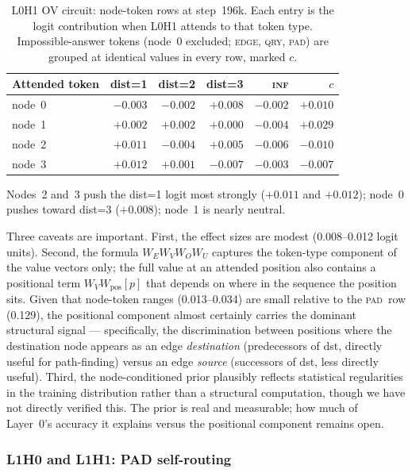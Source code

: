 \documentclass[11pt, a4paper]{article}
\newcommand{\INF}{\textsc{inf}}
\newcommand{\PAD}{\textsc{pad}}
\newcommand{\EDGE}{\textsc{edge}}
\newcommand{\QRY}{\textsc{qry}}
\begin{document}
\begin{table}[H]
\centering
\caption{L0H1 OV circuit: node-token rows at step~196k.  Each entry is
  the logit contribution when L0H1 attends to that token type.
  Impossible-answer tokens (node~0 excluded; \EDGE, \QRY, \PAD) are
  grouped at identical values in every row, marked $c$.}
\label{tab:l0h1-ov}
\begin{tabular}{@{}lrrrrr@{}}
\toprule
Attended token & dist=1 & dist=2 & dist=3 & \INF & $c$ \\
\midrule
node~0 & $-0.003$ & $-0.002$ & $\mathbf{+0.008}$ & $-0.002$ & $+0.010$ \\
node~1 & $+0.002$ & $+0.002$ & $+0.000$ & $-0.004$ & $+0.029$ \\
node~2 & $\mathbf{+0.011}$ & $-0.004$ & $+0.005$ & $-0.006$ & $-0.010$ \\
node~3 & $\mathbf{+0.012}$ & $+0.001$ & $-0.007$ & $-0.003$ & $-0.007$ \\
\bottomrule
\end{tabular}
\end{table}

Nodes~2 and~3 push the dist=1 logit most strongly ($+0.011$ and
$+0.012$); node~0 pushes toward dist=3 ($+0.008$); node~1 is nearly
neutral.

Three caveats are important.  First, the effect sizes are modest
(0.008--0.012 logit units).  Second, the formula $W_E W_V W_O W_U$
captures the token-type component of the value vectors only; the full
value at an attended position also contains a positional term
$W_V W_{\mathrm{pos}}[p]$ that depends on where in the sequence the
position sits.  Given that node-token ranges (0.013--0.034) are small
relative to the \PAD\ row (0.129), the positional component almost
certainly carries the dominant structural signal --- specifically, the
discrimination between positions where the destination node appears as
an edge \emph{destination} (predecessors of dst, directly useful for
path-finding) versus an edge \emph{source} (successors of dst, less
directly useful).  Third, the node-conditioned prior plausibly reflects
statistical regularities in the training distribution rather than a
structural computation, though we have not directly verified this.
The prior is real and measurable; how much of Layer~0's accuracy it
explains versus the positional component remains open.

\subsubsection{L1H0 and L1H1: PAD self-routing}
\end{document}

